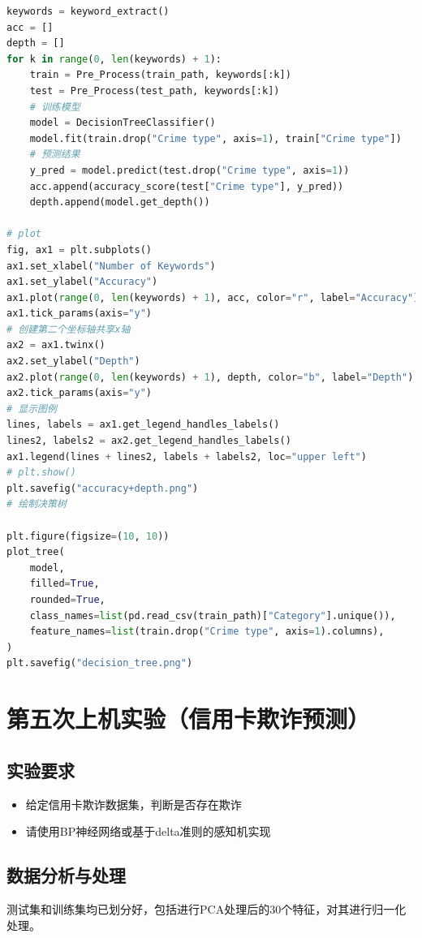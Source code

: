 \documentclass[a4paper,12pt]{report}
\begin{document}
\begin{lstlisting}[language=Python]
keywords = keyword_extract()
acc = []
depth = []
for k in range(0, len(keywords) + 1):
    train = Pre_Process(train_path, keywords[:k])
    test = Pre_Process(test_path, keywords[:k])
    # 训练模型
    model = DecisionTreeClassifier()
    model.fit(train.drop("Crime type", axis=1), train["Crime type"])
    # 预测结果
    y_pred = model.predict(test.drop("Crime type", axis=1))
    acc.append(accuracy_score(test["Crime type"], y_pred))
    depth.append(model.get_depth())

# plot
fig, ax1 = plt.subplots()
ax1.set_xlabel("Number of Keywords")
ax1.set_ylabel("Accuracy")
ax1.plot(range(0, len(keywords) + 1), acc, color="r", label="Accuracy")
ax1.tick_params(axis="y")
# 创建第二个坐标轴共享x轴
ax2 = ax1.twinx()
ax2.set_ylabel("Depth")
ax2.plot(range(0, len(keywords) + 1), depth, color="b", label="Depth")
ax2.tick_params(axis="y")
# 显示图例
lines, labels = ax1.get_legend_handles_labels()
lines2, labels2 = ax2.get_legend_handles_labels()
ax1.legend(lines + lines2, labels + labels2, loc="upper left")
# plt.show()
plt.savefig("accuracy+depth.png")
# 绘制决策树

plt.figure(figsize=(10, 10))
plot_tree(
    model,
    filled=True,
    rounded=True,
    class_names=list(pd.read_csv(train_path)["Category"].unique()),
    feature_names=list(train.drop("Crime type", axis=1).columns),
)
plt.savefig("decision_tree.png")

\end{lstlisting}
\clearpage
\chapter{第五次上机实验（信用卡欺诈预测）}
\section{实验要求}
\begin{itemize}
    \item 给定信用卡欺诈数据集，判断是否存在欺诈
    \item 请使用BP神经网络或基于delta准则的感知机实现
\end{itemize}
\section{数据分析与处理}
\par 测试集和训练集均已划分好，包括进行PCA处理后的30个特征，对其进行归一化处理。
\end{document}
